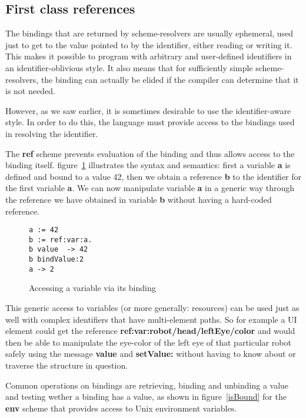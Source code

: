 \documentclass[preprint,authoryear]{acm_proc_article-sp}
\begin{document}
\subsection{First class references}

The bindings that are returned by scheme-resolvers are usually ephemeral, used just 
to get to the value pointed to by the identifier, either reading or writing it.  This
makes it possible to program with arbitrary and user-defined identifiers in
an identifier-oblivious style.  It also means that for sufficiently simple scheme-resolvers,
the binding can actually be elided if the compiler can determine that it is not needed.

However, as we saw earlier, it is sometimes
desirable to use the identifier-aware style.  In order to do this, the language
must provide access to the bindings used in resolving the identifier.

The {\bf ref} scheme prevents evaluation of the binding and thus allows access
to the binding itself.  figure~\ref{ref-binding} illustrates the syntax and semantics:
first a variable {\bf a} is defined and bound to a value 42, then we obtain a reference {\bf b} to
the identifier for the first variable {\bf a}.  We can now manipulate variable {\bf a} 
in a generic way through the reference we have obtained in variable {\bf b} without
having a hard-coded reference. 

\begin{figure}[htbp]
\begin{center}
\begin{small}
\begin{verbatim}
a := 42
b := ref:var:a.
b value  -> 42
b bindValue:2
a -> 2
\end{verbatim}
\end{small}
\caption{Accessing a variable via its binding}
\label{ref-binding}
\end{center}
\end{figure}

This generic access to variables (or more generally: resources) can be used just as well
with complex identifiers that have multi-element paths.  So for example a UI element
could get the reference {\bf ref:var:robot/head/leftEye/color} and would then be
able to manipulate the eye-color of the left eye of that particular robot safely using
the message {\bf value} and {\bf setValue:}
without having to know about or traverse the structure in question.

Common operations on bindings are retrieving, binding and unbinding a value and testing 
wether a binding has a value, as shown in figure~\ref{isBound} for the {\bf env} scheme
that provides access to Unix environment variables.
\end{document}
